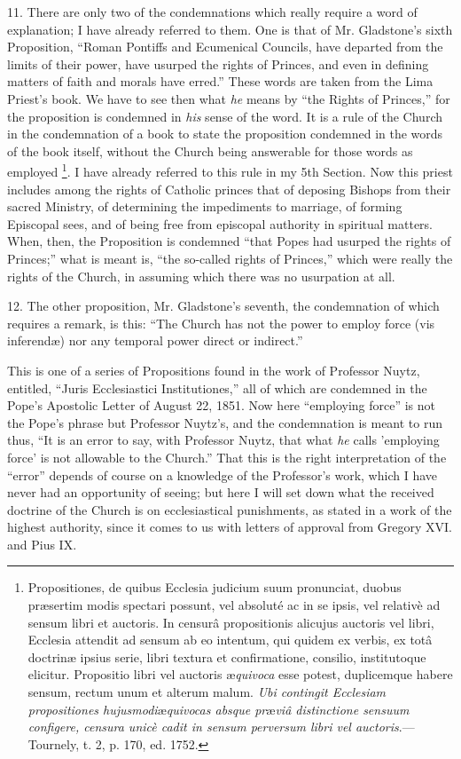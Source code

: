 11. There are only two of the condemnations which really require a
word of explanation; I have already referred to them. One is that of Mr.
Gladstone's sixth Proposition, ``Roman Pontiffs and Ecumenical
Councils, have departed from the limits of their power, have usurped the rights of Princes, and even in defining matters of faith and
morals have erred.'' These words are taken from the Lima Priest's
book. We have to see then what \emph{he} means by ``the Rights of
Princes,'' for the proposition is condemned in \emph{his} sense of
the word. It is a rule of the Church in the condemnation of a book to
state the proposition condemned in the words of the book itself, without
the Church being answerable for those words as employed \footnote{Propositiones, de quibus Ecclesia judicium
suum pronunciat, duobus præsertim modis spectari possunt, vel absoluté
ac in se ipsis, vel relativè ad sensum libri et auctoris. In censurâ
propositionis alicujus auctoris vel libri, Ecclesia attendit ad sensum
ab eo intentum, qui quidem ex verbis, ex totâ doctrinæ ipsius serie,
libri textura et confirmatione, consilio, institutoque elicitur.
Propositio libri vel auctoris æ\emph{quivoca} esse potest, duplicemque
habere sensum, rectum unum et alterum malum. \emph{Ubi contingit Ecclesiam
propositiones hujusmodi}æ\emph{quivocas absque pr}æ\emph{viâ distinctione sensuum
configere, censura unicè cadit in sensum perversum libri vel auctoris}.—Tournely,
t. 2, p. 170, ed. 1752.}. I have already referred to this rule in my 5th Section. Now this
priest includes among the rights of Catholic princes that of deposing
Bishops from their sacred Ministry, of determining the impediments to
marriage, of forming Episcopal sees, and of being free from episcopal
authority in spiritual matters. When, then, the Proposition is condemned
``that Popes had usurped the rights of Princes;'' what is meant
is, ``the so-called rights of Princes,'' which were really the
rights of the Church, in assuming which there was no usurpation at all.

12. The other proposition, Mr. Gladstone's seventh, the condemnation
of which requires a remark, is this: ``The Church has not the power
to employ force (vis inferendæ) nor any temporal power direct or
indirect.''

This is one of a series of Propositions found in the work of
Professor Nuytz, entitled, ``Juris Ecclesiastici Institutiones,''
all of which are condemned in the Pope's Apostolic Letter of August 22,
1851. Now here ``employing force'' is not the Pope's phrase but
Professor Nuytz's, and the condemnation is meant to run thus, ``It
is an error to say, with Professor Nuytz, that what \emph{he} calls
'employing force' is not allowable to the Church.'' That this is the
right interpretation of the ``error'' depends of course on a
knowledge of the Professor's work, which I have never had an opportunity
of seeing; but here I will set down what the received doctrine of the
Church is on ecclesiastical punishments, as stated in a work of the
highest authority, since it comes to us with letters of approval from
Gregory XVI. and Pius IX.


